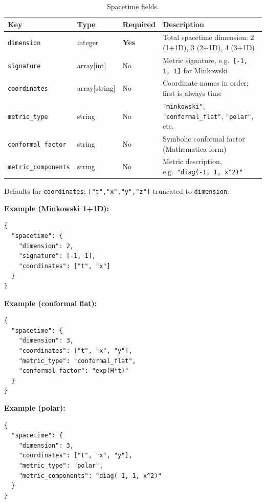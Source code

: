 \begin{table}[htbp]
\centering
\caption{Spacetime fields.}
\label{tab:json-spacetime}
\begin{tabular}{@{}llll@{}}
\toprule
Key & Type & Required & Description \\
\midrule
\texttt{dimension}         & integer       & \textbf{Yes} & Total spacetime dimension: 2 (1+1D), 3 (2+1D), 4 (3+1D) \\
\texttt{signature}         & array[int]    & No       & Metric signature, e.g.\ \texttt{[-1, 1, 1]} for Minkowski \\
\texttt{coordinates}       & array[string] & No       & Coordinate names in order; first is always time \\
\texttt{metric\_type}       & string        & No       & \texttt{"minkowski"}, \texttt{"conformal\_flat"}, \texttt{"polar"}, etc. \\
\texttt{conformal\_factor}  & string        & No       & Symbolic conformal factor (Mathematica form) \\
\texttt{metric\_components} & string        & No       & Metric description, e.g.\ \texttt{"diag(-1, 1, x\^{}2)"} \\
\bottomrule
\end{tabular}
\end{table}

Defaults for \texttt{coordinates}: \texttt{["t","x","y","z"]} truncated to \texttt{dimension}.

\textbf{Example (Minkowski 1+1D):}

\begin{lstlisting}[style=json]
{
  "spacetime": {
    "dimension": 2,
    "signature": [-1, 1],
    "coordinates": ["t", "x"]
  }
}
\end{lstlisting}

\textbf{Example (conformal flat):}

\begin{lstlisting}[style=json]
{
  "spacetime": {
    "dimension": 3,
    "coordinates": ["t", "x", "y"],
    "metric_type": "conformal_flat",
    "conformal_factor": "exp(H*t)"
  }
}
\end{lstlisting}

\textbf{Example (polar):}

\begin{lstlisting}[style=json]
{
  "spacetime": {
    "dimension": 3,
    "coordinates": ["t", "x", "y"],
    "metric_type": "polar",
    "metric_components": "diag(-1, 1, x^2)"
  }
}
\end{lstlisting}


